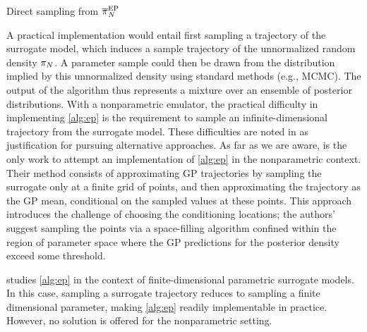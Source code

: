 \documentclass[12pt]{article}
\begin{document}
\begin{algorithm}
    \caption{Direct sampling from $\llikEmSampDensNorm$}
    \label{alg:ep}
    \begin{algorithmic}[1] %
        		\State $\llikEmRdm[\Ndesign]{\postDensNorm}^{(\sampleIndex)} \sim \law(\llikEmRdm[\Ndesign]{\postDensNorm})$ 
		\State $\Par^{(\sampleIndex)} \sim \llikEmRdm[\Ndesign]{\postDensNorm}^{(\sampleIndex)}}$ \Comment{Sample a parameter}
	\EndFor
	\State \Return $(\Par^{(1)}, \dots, \Par^{(\NSample)})$
	\EndFunction
    \end{algorithmic}
\end{algorithm}

A practical implementation 
would entail first sampling a trajectory of the surrogate model, which induces a sample 
trajectory of the unnormalized random density $\llikEmRdmDens[\Ndesign]$. A parameter sample 
could then be drawn from the distribution implied by this unnormalized density using standard 
methods (e.g., MCMC). The output of the algorithm thus represents a mixture over an 
ensemble of posterior distributions. With a nonparametric emulator, the practical difficulty in 
implementing \cref{alg:ep} is the requirement to sample an infinite-dimensional 
trajectory from the surrogate model.
These difficulties are noted in \citet{VehtariParallelGP} as justification for pursuing alternative 
approaches. As far as we are aware, \citet{trainDynamics} is the only work to attempt an 
implementation of \cref{alg:ep} in the nonparametric context. Their method consists of approximating GP 
trajectories by sampling the surrogate only at a finite grid of points, and then approximating 
the trajectory as the GP mean, conditional on the sampled values at these points.
This approach introduces the challenge of choosing the conditioning locations; the authors' 
suggest sampling the points via a space-filling algorithm confined within the region of parameter 
space where the GP predictions for the posterior density exceed some threshold.

\citet{BurknerSurrogate} studies \cref{alg:ep} in the context of finite-dimensional
parametric surrogate models. In this case, sampling a surrogate trajectory reduces to sampling a 
finite dimensional parameter, making \cref{alg:ep} readily implementable in practice.
However, no solution is offered for the nonparametric setting.
\end{document}
